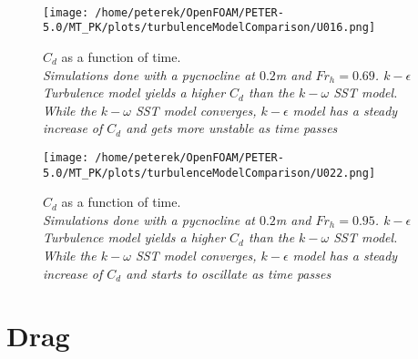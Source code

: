 \documentclass[a4paper, 12pt]{report}
\begin{document}
\\
\begin{minipage}[t]{.45\textwidth}
	\begin{figure}[H]
		\centering
		\texttt{[image: /home/peterek/OpenFOAM/PETER-5.0/MT\_PK/plots/turbulenceModelComparison/U016.png]}
		\caption{$C_d$ as a function of time.\\ \textit{Simulations done with a pycnocline at $0.2$m and $Fr_h=0.69$. $k-\epsilon$ Turbulence model yields a higher $C_d$ than the $k-\omega$ SST model. While the $k-\omega$ SST model converges, $k-\epsilon$ model has a steady increase of $C_d$ and gets more unstable as time passes}}
		\label{fig:turbulenceModelComparison1}
	\end{figure}
\end{minipage}\hfill
\vspace{2ex}
\begin{minipage}[t]{.45\textwidth} 
	\begin{figure}[H]
		\centering
		\texttt{[image: /home/peterek/OpenFOAM/PETER-5.0/MT\_PK/plots/turbulenceModelComparison/U022.png]}
		\caption{$C_d$ as a function of time.  \\ \textit{Simulations done with a pycnocline at $0.2$m and $Fr_h=0.95$. $k-\epsilon$ Turbulence model yields a higher $C_d$ than the $k-\omega$ SST model. While the $k-\omega$ SST model converges, $k-\epsilon$ model has a steady increase of $C_d$ and starts to oscillate as time passes}}
		\label{fig:turbulenceModelComparison2}
	\end{figure}
\end{minipage}\hfill

\section{Drag}
\end{document}

